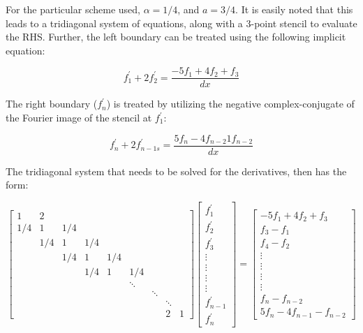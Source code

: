 \documentclass{article}
\begin{document}
    For the particular scheme used, $\alpha = 1/4$,
    and $ a = 3/4 $.
    It is easily noted that this leads to a tridiagonal system of equations,
    along with a 3-point stencil to evaluate the RHS.
    Further, the left boundary can be treated using the following implicit equation:

    \begin{equation}
        f^{\prime}_1 + 2f^{\prime}_2 = \frac{-5f_1 + 4f_2 + f_3}{dx}
    \end{equation}

    The right boundary ($f^{\prime}_{n}$) is treated by utilizing
    the negative complex-conjugate of the Fourier image of the stencil
    at $f^{\prime}_1$:

    \begin{equation}
        f^{\prime}_{n} + 2f^{\prime}_{n-1s}
        =
        \frac{5f_{n} - 4f_{n-2} 1 f_{n-2}}{dx}
    \end{equation}

    The tridiagonal system that needs to be solved for the derivatives,
    then has the form:

    \begin{equation} \label{eqn:compact-tridiagonal-system}
     \begin{bmatrix}
         1&2\\
         1/4&1&1/4\\
         &1/4&1&1/4\\
         &&1/4&1&1/4\\
         &&&1/4&1&1/4\\
         &&&&&\ddots\\
         &&&&&&\ddots\\
         &&&&&&&\ddots\\
         &&&&&&&2&1
      \end{bmatrix}
      \begin{bmatrix}
          f^{\prime}_1 \\
          f^{\prime}_2 \\
          f^{\prime}_3 \\
          \vdots \\
          \vdots \\
          \vdots \\
          \vdots \\
          f^{\prime}_{n-1} \\
          f^{\prime}_n
       \end{bmatrix}
     =
     \begin{bmatrix}
         -5f_1 + 4f_2 + f_3\\
         f_{3} - f_{1}\\
         f_{4} - f_{2}\\
         \vdots\\
         \vdots\\
         \vdots\\
         \vdots\\
         f_{n} - f_{n-2}\\
         5f_{n} - 4f_{n-1} - f_{n-2}
      \end{bmatrix}
    \end{equation}
\end{document}
